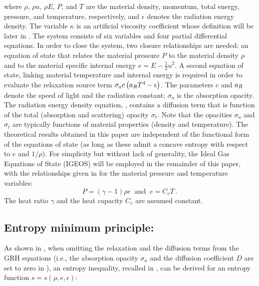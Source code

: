 \documentclass[times,doublespace]{fldauth}%
\begin{document}
%
where $\rho$, $\rho u$, $\rho E$, $P$, and $T$ are the material density, momentum, total energy, pressure, and temperature, respectively, and $\epsilon$ denotes the radiation energy density. The variable $\kappa$ is an artificial viscosity coefficient whose definition will be   later in .
The system consists of six variables and four partial differential equations. In order to close the system, two closure relationships are needed:  
an equation of state that relates the material pressure $P$ to the material density $\rho$ and to the 
material specific internal energy $e = E - \tfrac 1 2 u^2$. A second equation of state, linking material temperature 
and internal energy is required in order to evaluate the relaxation source term $\sigma_a c \left( a_R T^4 - \epsilon \right)$.
The parameters $c$ and $a_R$ denote the speed of light and the radiation constant; $\sigma_a$ is the absorption opacity. 
The radiation energy density equation, , contains a diffusion term that is function of the 
total (absorption and scattering) opacity $\sigma_t$. Note that the opacities $\sigma_a$ and $\sigma_t$ are typically functions of 
material properties (density and temperature). 
The theoretical results obtained in this paper are independent of the functional form of the equations of state 
(as long as these admit a concave entropy with respect to $e$ and $1/ \rho$). For simplicity but without lack of generality, the Ideal Gas Equations of State
(IGEOS) will be employed in the remainder of this paper, with the relationships given in  for the material pressure and temperature variables:
%
\begin{equation}\label{eq:IGEOS}
P = (\gamma-1) \rho e \ \text{  and  } \ e = C_v T \, .
\end{equation}
%
The heat ratio $\gamma$ and the heat capacity $C_v$ are assumed constant.
%
\subsection{Entropy minimum principle:}\label{sec:ent-min}
%
As shown in \cite{our_jcp_radhy_paper}, when omitting the relaxation and the diffusion terms from the GRH equations (i.e., the absorption opacity $\sigma_a$ and the diffusion coefficient $D$ are set to zero in ), an entropy inequality, recalled in , can be derived for an entropy function $s=s(\rho, e, \epsilon)$:
\end{document}
